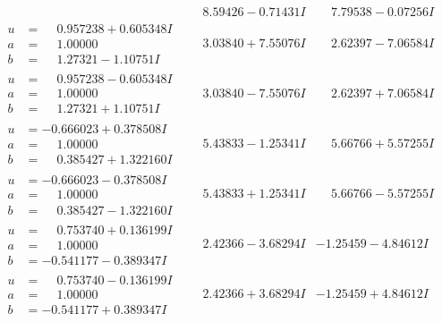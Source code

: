\documentclass[1p]{elsarticle_modified}
\theoremstyle{definition}
\begin{document}
$$\begin{array}{c|c|c}
 & \phantom{-}8.59426 - 0.71431 I & \phantom{-}7.79538 - 0.07256 I \\ \hline\begin{aligned}
u &= \phantom{-}0.957238 + 0.605348 I \\
a &= \phantom{-}1.00000\phantom{ +0.000000I} \\
b &= \phantom{-}1.27321 - 1.10751 I\end{aligned}
 & \phantom{-}3.03840 + 7.55076 I & \phantom{-}2.62397 - 7.06584 I \\ \hline\begin{aligned}
u &= \phantom{-}0.957238 - 0.605348 I \\
a &= \phantom{-}1.00000\phantom{ +0.000000I} \\
b &= \phantom{-}1.27321 + 1.10751 I\end{aligned}
 & \phantom{-}3.03840 - 7.55076 I & \phantom{-}2.62397 + 7.06584 I \\ \hline\begin{aligned}
u &= -0.666023 + 0.378508 I \\
a &= \phantom{-}1.00000\phantom{ +0.000000I} \\
b &= \phantom{-}0.385427 + 1.322160 I\end{aligned}
 & \phantom{-}5.43833 - 1.25341 I & \phantom{-}5.66766 + 5.57255 I \\ \hline\begin{aligned}
u &= -0.666023 - 0.378508 I \\
a &= \phantom{-}1.00000\phantom{ +0.000000I} \\
b &= \phantom{-}0.385427 - 1.322160 I\end{aligned}
 & \phantom{-}5.43833 + 1.25341 I & \phantom{-}5.66766 - 5.57255 I \\ \hline\begin{aligned}
u &= \phantom{-}0.753740 + 0.136199 I \\
a &= \phantom{-}1.00000\phantom{ +0.000000I} \\
b &= -0.541177 - 0.389347 I\end{aligned}
 & \phantom{-}2.42366 - 3.68294 I & -1.25459 - 4.84612 I \\ \hline\begin{aligned}
u &= \phantom{-}0.753740 - 0.136199 I \\
a &= \phantom{-}1.00000\phantom{ +0.000000I} \\
b &= -0.541177 + 0.389347 I\end{aligned}
 & \phantom{-}2.42366 + 3.68294 I & -1.25459 + 4.84612 I \\ \hline\begin{aligned}

\end{aligned}
\end{array}$$
\end{document}
